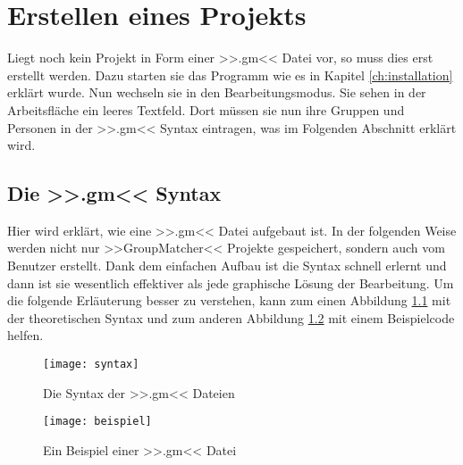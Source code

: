 \chapter{Erstellen eines Projekts}
\label{ch:erstellen_eines_projekts}

Liegt noch kein Projekt in Form einer >>.gm<< Datei vor, so muss dies erst erstellt werden. Dazu starten sie das Programm wie es in Kapitel \ref{ch:installation} erklärt wurde. Nun wechseln sie in den Bearbeitungsmodus. Sie sehen in der Arbeitsfläche ein leeres Textfeld. Dort müssen sie nun ihre Gruppen und Personen in der >>.gm<< Syntax eintragen, was im Folgenden Abschnitt erklärt wird.

\section{Die >>.gm<< Syntax}
\label{sec:die_>>.gm<<_syntax}

Hier wird erklärt, wie eine >>.gm<< Datei aufgebaut ist. In der folgenden Weise werden nicht nur >>GroupMatcher<< Projekte gespeichert, sondern auch vom Benutzer erstellt. Dank dem einfachen Aufbau ist die Syntax schnell erlernt und dann ist sie wesentlich effektiver als jede graphische Lösung der Bearbeitung. Um die folgende Erläuterung besser zu verstehen, kann zum einen Abbildung \ref{fig:die_syntax} mit der theoretischen Syntax  und zum anderen Abbildung \ref{fig:ein_beispiel} mit einem Beispielcode helfen.

\begin{figure}
	\texttt{[image: syntax]}
	\caption{Die Syntax der >>.gm<< Dateien}
	\label{fig:die_syntax}
\end{figure}

\begin{figure}
	\texttt{[image: beispiel]}
	\caption{Ein Beispiel einer >>.gm<< Datei}
	\label{fig:ein_beispiel}
\end{figure}

